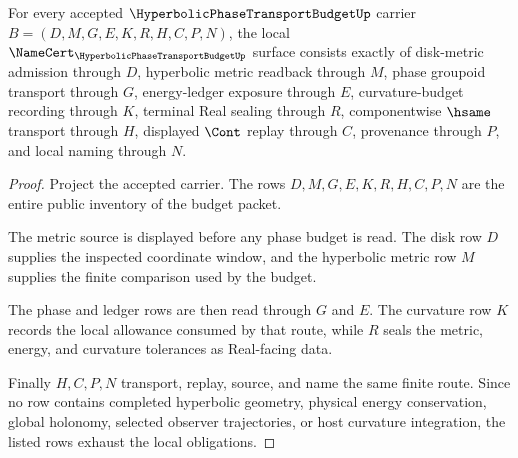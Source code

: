 \begin{theorem}
\label{thm:hyperbolic-phase-transport-budget-obligations}
For every accepted $\HyperbolicPhaseTransportBudgetUp$ carrier $B=(D,M,G,E,K,R,H,C,P,N)$, the local $\NameCert_{\HyperbolicPhaseTransportBudgetUp}$ surface consists exactly of disk-metric admission through $D$, hyperbolic metric readback through $M$, phase groupoid transport through $G$, energy-ledger exposure through $E$, curvature-budget recording through $K$, terminal Real sealing through $R$, componentwise $\hsame$ transport through $H$, displayed $\Cont$ replay through $C$, provenance through $P$, and local naming through $N$.
\end{theorem}
\begin{proof}
Project the accepted carrier. The rows $D,M,G,E,K,R,H,C,P,N$ are the entire public inventory of the budget packet.

The metric source is displayed before any phase budget is read. The disk row $D$ supplies the inspected coordinate window, and the hyperbolic metric row $M$ supplies the finite comparison used by the budget.

The phase and ledger rows are then read through $G$ and $E$. The curvature row $K$ records the local allowance consumed by that route, while $R$ seals the metric, energy, and curvature tolerances as Real-facing data.

Finally $H,C,P,N$ transport, replay, source, and name the same finite route. Since no row contains completed hyperbolic geometry, physical energy conservation, global holonomy, selected observer trajectories, or host curvature integration, the listed rows exhaust the local obligations.
\end{proof}


